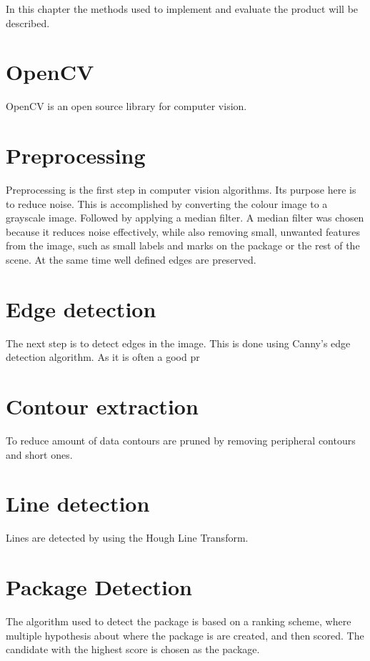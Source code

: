 In this chapter the methods used to implement and evaluate the product will be described.

\section{OpenCV}

OpenCV is an open source library for computer vision. 

\section{Preprocessing}

Preprocessing is the first step in computer vision algorithms. 
Its purpose here is to reduce noise. 
This is accomplished by converting the colour image to a grayscale image. 
Followed by applying a median filter. 
A median filter was chosen because it reduces noise effectively, while also removing small, unwanted features from the image, such as small labels and marks on the package or the rest of the scene. 
At the same time well defined edges are preserved.

\section{Edge detection}

The next step is to detect edges in the image. This is done using Canny's edge detection algorithm. As it is often a good pr


\section{Contour extraction}

To reduce amount of data contours are pruned by removing peripheral contours and short ones.

\section{Line detection}

Lines are detected by using the Hough Line Transform.

\section{Package Detection}

The algorithm used to detect the package is based on a ranking scheme, where multiple hypothesis about where the package is are created, and then scored. 
The candidate with the highest score is chosen as the package. 

